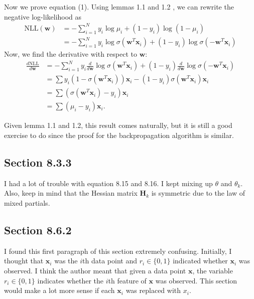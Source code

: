 \documentclass[a4paper,11pt]{article}
\theoremstyle{plain}
\newcounter{exercise}
\begin{document}
Now we prove equation (1). Using lemmas 1.1 and 1.2 , we can rewrite the negative log-likelihood as
\begin{align*}
	\text{NLL}(\mathbf{w})&=-\sum\limits_{i=1}^{N}
	y_i\log\mu_i + (1-y_i)\log(1-\mu_i) \\
    & = -\sum\limits_{i=1}^{N}
	y_i\log\sigma\left(\mathbf{w}^{T} \mathbf{x}_i\right)
	+ (1 - y_i)\log\sigma\left(-\mathbf{w}^{T} \mathbf{x}_i\right)
\end{align*}
Now, we find the derivative with respect to $\mathbf{w}$:
\begin{align*}
	\frac{d\text{NLL}}{d\mathbf{w}}
    &= -\sum \limits_{i=1}^{N}y_i
    \frac{d}{d\mathbf{w}}
    \log\sigma(\mathbf{w}^{T}\mathbf{x}_i) + 
    (1 - y_i)
    \frac{d}{d\mathbf{w}}
    \log\sigma(-\mathbf{w}^{T} \mathbf{x}_i) \\
    &= \sum
    y_i (1-\sigma(\mathbf{w}^{T}\mathbf{x}_i))\mathbf{x}_i
    -(1-y_i)\sigma(\mathbf{w}^{T}\mathbf{x}_i)\mathbf{x}_i\\
    &= \sum (\sigma(\mathbf{w}^{T}\mathbf{x}_i)-y_i)
    \mathbf{x}_i \\
    &= \sum (\mu_i - y_i)\mathbf{x}_i.
\end{align*}

Given lemma 1.1 and 1.2, this result comes naturally, but it is still a good exercise to do since
the proof for the backpropagation algorithm is similar.

\subsection*{Section 8.3.3}
I had a lot of trouble with equation 8.15 and 8.16. I 
kept mixing up $\theta$ and $\theta_k$. Also, keep in
mind that the Hessian matrix $\mathbf{H}_k$ is symmetric
due to the law of mixed partials.

\subsection*{Section 8.6.2}
I found this first paragraph of this section extremely confusing. Initially, I thought
that $\mathbf{x}_i$ was the $i$th data point and $r_i  \in \{0, 1\}$ indicated whether
$\mathbf{x}_i$ was observed. I think the author meant that given a
data point $\mathbf{x}$, the variable $r_i\in\{0, 1\}$ indicates whether the $i$th feature of
$\mathbf{x}$ was observed. This section would make a lot more sense if each $\mathbf{x}_i$ 
was replaced with $x_i$.
\end{document}
